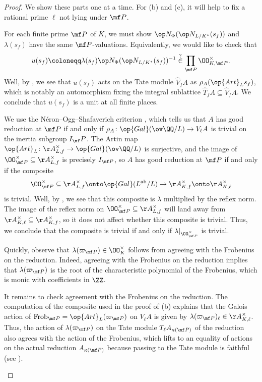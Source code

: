 \documentclass[../thesis.tex]{subfiles}
\begin{document}
\begin{proof}
	We show these parts one at a time. For (b) and (c), it will help to fix a rational prime $\ell$ not lying under $\mf P$.
	\begin{listalph}
		\item For each finite prime $\mf P$ of $K$, we must show $\op N_\Phi(\op N_{L/K^*}(s_f))$ and $\lambda(s_f)$ have the same $\mf P$-valuations. Equivalently, we would like to check that
		\[u(s_f)\coloneqq\lambda(s_f)\op N_\Phi(\op N_{L/K^*}(s_f))^{-1}\stackrel?\in\prod_{\mf P}\OO_{K,\mf P}^\times.\]
		Well, by , we see that $u(s_f)$ acts on the Tate module $\widehat V_fA$ as $\rho_A(\op{Art}_Ls_f)$, which is notably an automorphism fixing the integral sublattice $\widehat T_fA\subseteq\widehat V_fA$. We conclude that $u(s_f)$ is a unit at all finite places.

		\item We use the N\'eron--Ogg--Shafaverich criterion \cite{good-reduction-serre-tate}, which tells us that $A$ has good reduction at $\mf P$ if and only if $\rho_A\colon\op{Gal}(\ov\QQ/L)\to V_\ell A$ is trivial on the inertia subgroup $I_\mf P$. The Artin map $\op{Art}_L\colon\AA_{L,f}^\times\to\op{Gal}(\ov\QQ/L)$ is surjective, and the image of $\OO_{\mf P}^\times\subseteq\AA_{L,f}^\times$ is precisely $I_{\mf P}$, so $A$ has good reduction at $\mf P$ if and only if the composite
		\[\OO_{\mf P}^\times\subseteq\AA_{L,f}^\times\onto\op{Gal}(L^{\mathrm{ab}}/L)\to\AA_{K,f}^\times\onto\AA_{K,\ell}^\times\]
		is trivial. Well, by , we see that this composite is $\lambda$ multiplied by the reflex norm. The image of the reflex norm on $\OO_{\mf P}^\times\subseteq\AA_{L,f}^\times$ will land away from $\AA_{K,\ell}^\times\subseteq\AA_{K,f}^\times$, so it does not affect whether this composite is trivial. Thus, we conclude that the composite is trivial if and only if $\lambda|_{\OO_{\mf P}^\times}$ is trivial.

		\item Quickly, observe that $\lambda(\varpi_{\mf P})\in\OO_K^\times$ follows from agreeing with the Frobenius on the reduction. Indeed, agreeing with the Frobenius on the reduction implies that $\lambda(\varpi_{\mf P})$ is the root of the characteristic polynomial of the Frobenius, which is monic with coefficients in $\ZZ$.
		
		It remains to check agreement with the Frobenius on the reduction. The computation of the composite used in the proof of (b) explains that the Galois action of $\mathrm{Frob}_{\mf P}=\op{Art}_L(\varpi_{\mf P})$ on $V_\ell A$ is given by $\lambda(\varpi_{\mf P})_\ell\in\AA_{K,\ell}^\times$. Thus, the action of $\lambda(\varpi_{\mf P})$ on the Tate module $T_\ell A_{\kappa(\mf P)}$ of the reduction also agrees with the action of the Frobenius, which lifts to an equality of actions on the actual reduction $A_{\kappa(\mf P)}$ because passing to the Tate module is faithful (see ).
		\qedhere
	\end{listalph}
\end{proof}
\end{document}
